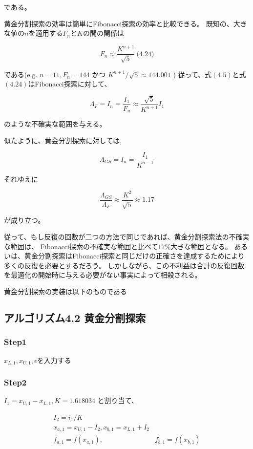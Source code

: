 である。

黄金分割探索の効率は簡単にFibonacci探索の効率と比較できる。
既知の、大きな値の$n$を適用する$F_n$と$K$の間の関係は

$$F_n \approx
\frac{K^{n+1}}{\sqrt{5}}
\ \text{(4.24)}$$

である(e.g. $n=11, F_n =144$ かつ $K^{n+1} /
\sqrt{5} \approx 144.001$ )
従って、式$(4.5)$と式$(4.24)$はFibonacci探索に対して、

$$ \Lambda_F = I_n =
\frac{I_1}{F_n} \approx
\frac{\sqrt{5}}{K^{n+1}} I_1
$$

のような不確実な範囲を与える。

似たように、黄金分割探索に対しては,

$$\Lambda_{GS} = I_n =
\frac{I_1}{K^{n-1}}$$

それゆえに

$$
\frac{\Lambda_{GS}}{\Lambda_F}
\approx \frac{K^2}{\sqrt{5}}
\approx 1.17 $$

が成り立つ。

従って、もし反復の回数が二つの方法で同じであれば、黄金分割探索法の不確実な範囲は、
Fibonacci探索の不確実な範囲と比べて$17\%$大きな範囲となる。
あるいは、黄金分割探索はFibonacci探索と同じだけの正確さを達成するためにより多くの反復を必要とするだろう。
しかしながら、この不利益は合計の反復回数を最適化の開始時に与える必要がない事実によって相殺される。

黄金分割探索の実装は以下のものである

\newpage

\subsection*{アルゴリズム4.2 黄金分割探索}\label{-4-2-}

\subsubsection*{Step1}\label{step1}

$x_{L,1}, x_{U,1}, \epsilon$を入力する

\subsubsection*{Step2}\label{step2}

$I_1 = x_{U,1} - x_{L,1}, K = 1.618034$ と割り当て、

$$ \begin{array}{ll}I_2 = i_1 / K
\\ x_{a,1} = x_{U,1} - I_2,
x_{b,1} = x_{L,1} + I_2 \\
f_{a,1} = f(x_{a,1}), & f_{b,1} = f(x_{b,1})
\end{array} $$

